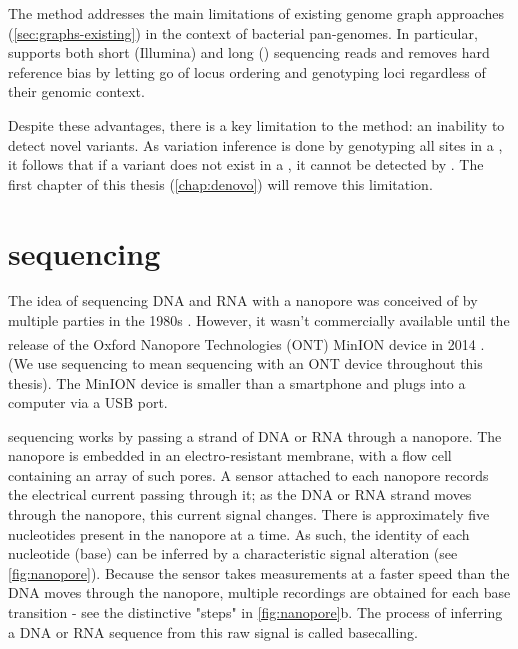 \hspace{0.75cm}

\noindent
The \pandora{} method addresses the main limitations of existing genome graph approaches (\autoref{sec:graphs-existing}) in the context of bacterial pan-genomes. In particular, \pandora{} supports both short (Illumina) and long (\ont{}) sequencing reads and removes hard reference bias by letting go of locus ordering and genotyping loci regardless of their genomic context.

Despite these advantages, there is a key limitation to the method: an inability to detect novel variants. As variation inference is done by genotyping all sites in a \prg{}, it follows that if a variant does not exist in a \prg{}, it cannot be detected by \pandora{}. The first chapter of this thesis (\autoref{chap:denovo}) will remove this limitation. 

\section{\ont{} sequencing}
\label{sec:intro-ont}
The idea of sequencing DNA and RNA with a nanopore was conceived of by multiple parties in the 1980s \cite{Deamer2016}. However, it wasn't commercially available until the release of the Oxford Nanopore Technologies (ONT) MinION\textsuperscript{\texttrademark} device in 2014 \cite{Quick2014,Deamer2016}. (We use \emph{\ont{}} sequencing to mean sequencing with an ONT device throughout this thesis). The MinION device is smaller than a smartphone and plugs into a computer via a USB port.

\ont{} sequencing works by passing a strand of DNA or RNA through a nanopore. The nanopore is embedded in an electro-resistant membrane, with a flow cell containing an array of such pores. A sensor attached to each nanopore records the electrical current passing through it; as the DNA or RNA strand moves through the nanopore, this current signal changes. There is approximately five nucleotides present in the nanopore at a time. As such, the identity of each nucleotide (base) can be inferred by a characteristic signal alteration (see \autoref{fig:nanopore}). Because the sensor takes measurements at a faster speed than the DNA moves through the nanopore, multiple recordings are obtained for each base transition - see the distinctive "steps" in \autoref{fig:nanopore}b. The process of inferring a DNA or RNA sequence from this raw signal is called basecalling.

